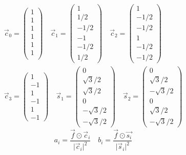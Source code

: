 \begin{equation}
\boxed{\begin{array}{l}
\overrightarrow{c}_0=\begin{pmatrix}1\\1\\1\\1\\1\\1\\\end{pmatrix}\quad \overrightarrow{c}_1=\begin{pmatrix}1\\1/2\\-1/2\\-1\\-1/2\\1/2\end{pmatrix}\quad \overrightarrow{c}_2=\begin{pmatrix}1\\-1/2\\-1/2\\1\\-1/2\\-1/2\end{pmatrix}\\
\overrightarrow{c}_3=\begin{pmatrix}1\\-1\\1\\-1\\1\\-1\end{pmatrix}\quad \overrightarrow{s}_1=\begin{pmatrix}0\\\sqrt{3}/2\\\sqrt{3}/2\\0\\-\sqrt{3}/2\\-\sqrt{3}/2\end{pmatrix}\quad \overrightarrow{s}_2=\begin{pmatrix}0\\\sqrt{3}/2\\-\sqrt{3}/2\\0\\\sqrt{3}/2\\-\sqrt{3}/2\end{pmatrix}
\end{array}}
\end{equation}
\begin{equation}
\boxed{a_i=\dfrac{\overrightarrow{f}\odot \overrightarrow{c}_i}{\Big\vert\overrightarrow{c}_i\Big\vert^2}}\quad \boxed{b_i=\dfrac{\overrightarrow{f}\odot \overrightarrow{s_i}}{\Big\vert\overrightarrow{s}_i\Big\vert^2}}
\end{equation}
